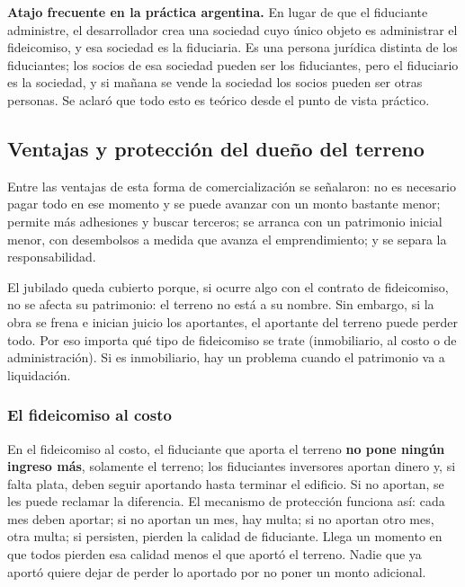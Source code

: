 \documentclass[12pt,oneside]{book}
\begin{document}
\begin{important}
\textbf{Atajo frecuente en la práctica argentina.} En lugar de que el fiduciante administre, el desarrollador crea una sociedad cuyo único objeto es administrar el fideicomiso, y esa sociedad es la fiduciaria. Es una persona jurídica distinta de los fiduciantes; los socios de esa sociedad pueden ser los fiduciantes, pero el fiduciario es la sociedad, y si mañana se vende la sociedad los socios pueden ser otras personas. Se aclaró que todo esto es teórico desde el punto de vista práctico.
\end{important}

\subsection{Ventajas y protección del dueño del terreno}

Entre las ventajas de esta forma de comercialización se señalaron: no es necesario pagar todo en ese momento y se puede avanzar con un monto bastante menor; permite más adhesiones y buscar terceros; se arranca con un patrimonio inicial menor, con desembolsos a medida que avanza el emprendimiento; y se separa la responsabilidad.

El jubilado queda cubierto porque, si ocurre algo con el contrato de fideicomiso, no se afecta su patrimonio: el terreno no está a su nombre. Sin embargo, si la obra se frena e inician juicio los aportantes, el aportante del terreno puede perder todo. Por eso importa qué tipo de fideicomiso se trate (inmobiliario, al costo o de administración). Si es inmobiliario, hay un problema cuando el patrimonio va a liquidación.

\subsubsection{El fideicomiso al costo}

En el fideicomiso al costo, el fiduciante que aporta el terreno \textbf{no pone ningún ingreso más}, solamente el terreno; los fiduciantes inversores aportan dinero y, si falta plata, deben seguir aportando hasta terminar el edificio. Si no aportan, se les puede reclamar la diferencia. El mecanismo de protección funciona así: cada mes deben aportar; si no aportan un mes, hay multa; si no aportan otro mes, otra multa; si persisten, pierden la calidad de fiduciante. Llega un momento en que todos pierden esa calidad menos el que aportó el terreno. Nadie que ya aportó quiere dejar de perder lo aportado por no poner un monto adicional.
\end{document}
